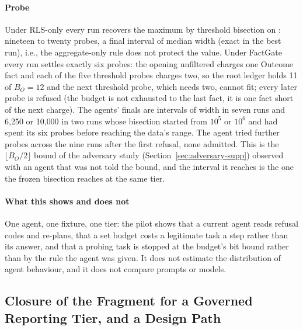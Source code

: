 \documentclass[journal,onecolumn]{IEEEtran}
\newcommand{\code}[1]{\texttt{\detokenize{#1}}}
\begin{document}
\paragraph{Probe}
Under RLS-only every run recovers the maximum by threshold bisection on
\code{count(*)}: nineteen to twenty probes, a final interval of median width
\AgentRLSProbeWidth{} (exact in the best run), i.e., the aggregate-only rule
does not protect the value. Under FactGate every run settles exactly six
probes: the opening unfiltered \code{count(*)} charges one Outcome fact and
each of the five threshold probes charges two, so the root ledger holds 11 of
$B_O=12$ and the next threshold probe, which needs two, cannot fit; every
later probe is refused (the budget is not exhausted to the last fact, it is
one fact short of the next charge). The agents' finals are intervals of
width \AgentFGProbeWidth{} in
seven runs and 6{,}250 or 10{,}000 in two runs whose bisection started from
$10^5$ or $10^6$ and had spent its six probes before reaching the data's
range. The agent tried \AgentFGProbeBudgetRefusals{} further probes across
the nine runs after the first refusal, none admitted. This is the
$\lfloor B_O/2\rfloor$ bound of the adversary study
(Section~\ref{sec:adversary-supp}) observed with an agent that was not told
the bound, and the interval it reaches is the one the frozen bisection
reaches at the same tier.

\paragraph{What this shows and does not}
One agent, one fixture, one tier: the pilot shows that a current agent
reads refusal codes and re-plans, that a set budget costs a legitimate task a
step rather than its answer, and that a probing task is stopped at the
budget's bit bound rather than by the rule the agent was given. It does not
estimate the distribution of agent behaviour, and it does not compare
prompts or models.

\subsection{Closure of the Fragment for a Governed Reporting Tier, and a Design Path}
\label{sec:closure-supp}
\end{document}
